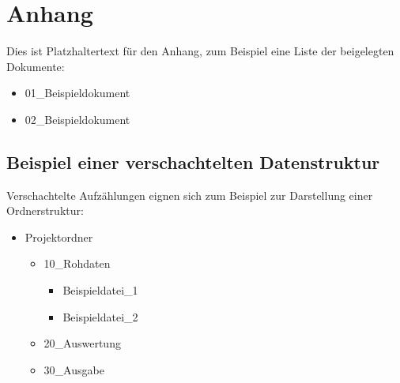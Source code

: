 \section{Anhang}
\label{sec:anhang}

Dies ist Platzhaltertext für den Anhang, zum Beispiel eine Liste der beigelegten
Dokumente:
\begin{itemize}
    \item 01\_Beispieldokument
    \item 02\_Beispieldokument
\end{itemize}

\subsection{Beispiel einer verschachtelten Datenstruktur}
\label{subsec:datenstruktur}
Verschachtelte Aufzählungen eignen sich zum Beispiel zur Darstellung einer
Ordnerstruktur:
\begin{itemize}
    \item Projektordner
    \begin{itemize}
        \item 10\_Rohdaten
        \begin{itemize}
            \item Beispieldatei\_1
            \item Beispieldatei\_2
        \end{itemize}
        \item 20\_Auswertung
        \item 30\_Ausgabe
    \end{itemize}
\end{itemize}
